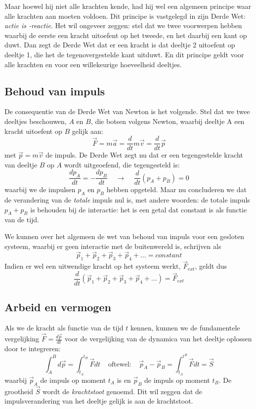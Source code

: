 Maar hoewel hij niet alle krachten kende, had hij wel een algemeen
principe waar alle krachten aan moeten voldoen. Dit principe is vastgelegd in zijn
Derde Wet: {\it actie is -reactie}.  Het wil ongeveer zeggen:
stel dat we twee voorwerpen hebben waarbij de eerste een kracht
uitoefent op het tweede, en het daarbij een kant op duwt. Dan
zegt de Derde Wet dat er een kracht is dat deeltje 2 uitoefent
op deeltje 1, die het de tegenovergestelde kant uitduwt. En dit
principe geldt voor alle krachten en voor een willekeurige
hoeveelheid deeltjes.
\subsection{Behoud van impuls}
De consequentie van de Derde Wet van Newton is het volgende. Stel dat we twee deeltjes beschouwen, $A$ en $B$, die botsen volgens Newton, waarbij deeltje A een kracht uitoefent op $B$ gelijk aan: 
\[ \vec{F}=m\vec{a} = \frac{d}{dt} m\vec{v} = \frac{d}{dt} \vec{p} \]
met $\vec{p}=m\vec{v}$ de impuls. De Derde Wet zegt nu dat er een
tegengestelde kracht van deeltje $B$ op $A$ wordt uitgeoefend, die
tegengesteld is:
\begin{equation}
\frac{dp_A}{dt} = -\frac{dp_B}{dt} \;\;\;\; \rightarrow \;\;\;\; \frac{d}{dt}(p_A+p_B) = 0
\end{equation}
waarbij we de impulsen $p_A$ en $p_B$ hebben opgeteld. Maar nu concluderen we
 dat de verandering van de {\it totale} impuls nul is, met andere woorden: de totale impuls $p_A+p_B$ is
behouden bij de interactie: het is een getal dat constant is als functie van de tijd.

We kunnen over het algemeen de wet van behoud van impuls voor een gesloten systeem, waarbij er geen interactie met de buitenwereld is, schrijven als
\begin{equation}
\vec{p}_1 + \vec{p}_2 +\vec{p}_3 + \vec{p}_4 + \dots = constant 
\end{equation} 
Indien er wel een uitwendige kracht op het systeem werkt, $\vec{F}_{ext}$, geldt dus
\begin{equation}
\frac{d}{dt}\left(\vec{p}_1 + \vec{p}_2 +\vec{p}_3 + \vec{p}_4 + \dots \right) = \vec{F}_{ext}
\end{equation}
\subsection{Arbeid en vermogen}
Als we de kracht als functie van de tijd $t$ kennen, kunnen we de fundamentele vergelijking $\vec{F}=\frac{d\vec{p}}{dt}$ voor de vergelijking van de dynamica van het deeltje oplossen door te integreren:
\begin{equation}
\int_A^B d \vec{p} = \int_{t_A}^{t_B} \vec{F} dt  \;\;\;\; \mbox{oftewel:} \;\;\;\;
\vec{p}_A-\vec{p}_B = \int_{t_A}^{t^B} \vec{F} dt = \vec{S}
\end{equation} 
waarbij $\vec{p}_A$ de impuls op moment $t_A$ is en $\vec{p}_B$ de
impuls op moment $t_B$. De grootheid $\vec{S}$ wordt de {\it krachtstoot}
genoemd. Dit wil zeggen dat de impulsverandering van het deeltje
gelijk is aan de krachtstoot.

